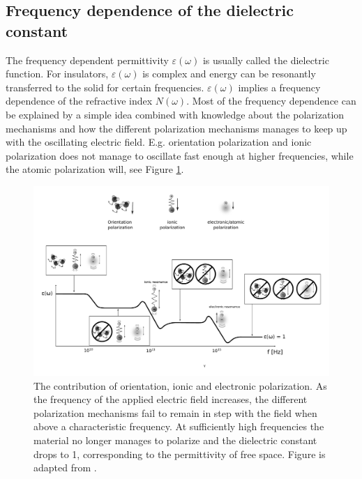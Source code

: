 \subsection{Frequency dependence of the dielectric constant}
The frequency dependent permittivity  $\varepsilon (\omega)$ is usually called the dielectric function.
For insulators, $\varepsilon(\omega)$ is complex and energy can be resonantly transferred to the solid
for certain frequencies. $\varepsilon(\omega)$ implies a frequency dependence of the refractive
index $N(\omega)$. Most of the frequency dependence can be explained by a simple idea 
combined with knowledge about the polarization mechanisms and how the different polarization mechanisms
manages to keep up with the oscillating electric field. E.g. orientation polarization and ionic polarization
does not manage to oscillate fast enough at higher frequencies, while the atomic polarization will, see
Figure \ref{fig:polarizationContribution}.
%
\begin{figure}[h!]
  \centering
   \includegraphics[width=1.0\textwidth]{../Figures/polarizationContributionToPermittivity.pdf}
   \caption{ 
      The contribution of orientation, ionic and electronic polarization. As the frequency
      of the applied electric field increases, the different polarization mechanisms fail to remain in 
      step with the field when above a characteristic frequency. At sufficiently high 
      frequencies the material no longer manages to polarize and the dielectric constant drops 
      to 1, corresponding to the permittivity of free space. Figure is adapted from 
      \cite{cambdridgePermittivityPage}.
   }
   \label{fig:polarizationContribution}
\end{figure}
%
\\
